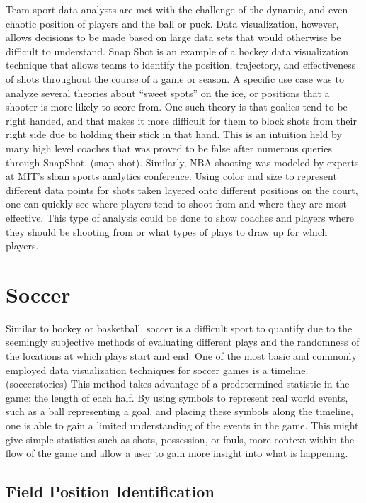 \documentclass[sigconf]{acmart}
\begin{document}
Team sport data analysts are met with the challenge of the dynamic, and even chaotic position of players and the ball or puck. Data visualization, however, allows decisions to be made based on large data sets that would otherwise be difficult to understand. Snap Shot is an example of a hockey data visualization technique that allows teams to identify the position, trajectory, and effectiveness of shots throughout the course of a game or season. A specific use case was to analyze several theories about “sweet spots” on the ice, or positions that a shooter is more likely to score from. One such theory is that goalies tend to be right handed, and that makes it more difficult for them to block shots from their right side due to holding their stick in that hand. This is an intuition held by many high level coaches that was proved to be false after numerous queries through SnapShot. (snap shot). Similarly, NBA shooting was modeled by experts at MIT’s sloan sports analytics conference. Using color and size to represent different data points for shots taken layered onto different positions on the court, one can quickly see where players tend to shoot from and where they are most effective. This type of analysis could be done to show coaches and players where they should be shooting from or what types of plays to draw up for which players.

\section{Soccer}

Similar to hockey or basketball, soccer is a difficult sport to quantify due to the seemingly subjective methods of evaluating different plays and the randomness of the locations at which plays start and end. One of the most basic and commonly employed data visualization techniques for soccer games is a timeline. (soccerstories) This method takes advantage of a predetermined statistic in the game: the length of each half. By using symbols to represent real world events, such as a ball representing a goal, and placing these symbols along the timeline, one is able to gain a limited understanding of the events in the game. This might give simple statistics such as shots, possession, or fouls, more context within the flow of the game and allow a user to gain more insight into what is happening. 

\subsection{Field Position Identification}
\end{document}
